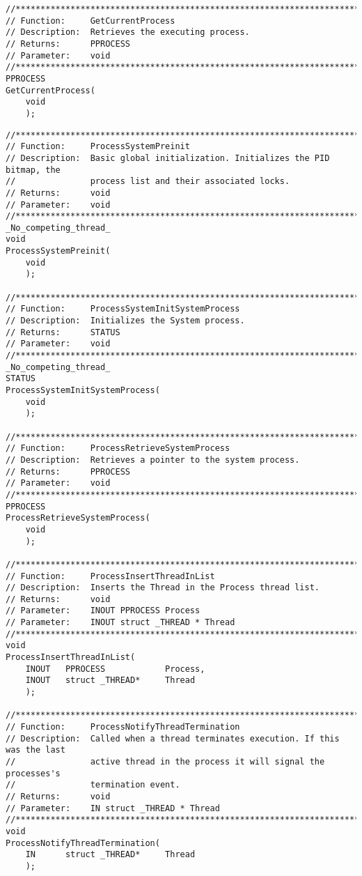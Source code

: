 \begin{appendices}
\begin{lstlisting}[caption={Process Public Interface},label={lst:ProcPublic}]
//******************************************************************************
// Function:     GetCurrentProcess
// Description:  Retrieves the executing process.
// Returns:      PPROCESS
// Parameter:    void
//******************************************************************************
PPROCESS
GetCurrentProcess(
    void
    );
\end{lstlisting}

\begin{lstlisting}[caption={Process Private Interface},label={lst:ProcPrivate}]
//******************************************************************************
// Function:     ProcessSystemPreinit
// Description:  Basic global initialization. Initializes the PID bitmap, the
//               process list and their associated locks.
// Returns:      void
// Parameter:    void
//******************************************************************************
_No_competing_thread_
void
ProcessSystemPreinit(
    void
    );

//******************************************************************************
// Function:     ProcessSystemInitSystemProcess
// Description:  Initializes the System process.
// Returns:      STATUS
// Parameter:    void
//******************************************************************************
_No_competing_thread_
STATUS
ProcessSystemInitSystemProcess(
    void
    );

//******************************************************************************
// Function:     ProcessRetrieveSystemProcess
// Description:  Retrieves a pointer to the system process.
// Returns:      PPROCESS
// Parameter:    void
//******************************************************************************
PPROCESS
ProcessRetrieveSystemProcess(
    void
    );

//******************************************************************************
// Function:     ProcessInsertThreadInList
// Description:  Inserts the Thread in the Process thread list.
// Returns:      void
// Parameter:    INOUT PPROCESS Process
// Parameter:    INOUT struct _THREAD * Thread
//******************************************************************************
void
ProcessInsertThreadInList(
    INOUT   PPROCESS            Process,
    INOUT   struct _THREAD*     Thread
    );

//******************************************************************************
// Function:     ProcessNotifyThreadTermination
// Description:  Called when a thread terminates execution. If this was the last
//               active thread in the process it will signal the processes's
//               termination event.
// Returns:      void
// Parameter:    IN struct _THREAD * Thread
//******************************************************************************
void
ProcessNotifyThreadTermination(
    IN      struct _THREAD*     Thread
    );


\end{lstlisting}
\end{appendices}
